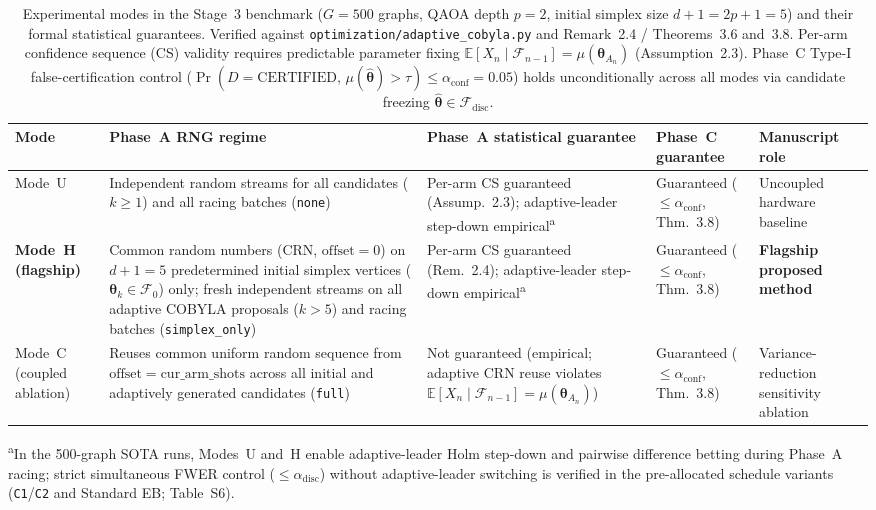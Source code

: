 \begin{table}[htbp]
\caption{Experimental modes in the Stage~3 benchmark ($G=500$ graphs, QAOA depth $p=2$, initial simplex size $d+1=2p+1=5$) and their formal statistical guarantees. Verified against \texttt{optimization/adaptive\_cobyla.py} and Remark~2.4 / Theorems~3.6 and~3.8. Per-arm confidence sequence (CS) validity requires predictable parameter fixing $\mathbb{E}[X_n \mid \mathcal{F}_{n-1}] = \mu(\bm{\theta}_{A_n})$ (Assumption~2.3). Phase~C Type-I false-certification control ($\Pr(D=\mathrm{CERTIFIED},\, \mu(\hat{\bm{\theta}}) > \tau) \le \alpha_{\mathrm{conf}} = 0.05$) holds unconditionally across all modes via candidate freezing $\hat{\bm{\theta}} \in \mathcal{F}_{\mathrm{disc}}$.}
\label{tab:modes}
\centering
\footnotesize
\begin{tabular}{@{}p{2.6cm} p{4.4cm} p{4.1cm} p{3.2cm} p{2.6cm}@{}}
\toprule
Mode & Phase~A RNG regime & Phase~A statistical guarantee & Phase~C guarantee & Manuscript role \\
\midrule
Mode~U & Independent random streams for all candidates ($k \ge 1$) and all racing batches (\texttt{none}) & Per-arm CS guaranteed (Assump.~2.3); adaptive-leader step-down empirical\textsuperscript{a} & Guaranteed ($\le \alpha_{\mathrm{conf}}$, Thm.~3.8) & Uncoupled hardware baseline \\
\textbf{Mode~H (flagship)} & Common random numbers (CRN, $\mathrm{offset}=0$) on $d+1=5$ predetermined initial simplex vertices ($\bm{\theta}_k \in \mathcal{F}_0$) only; fresh independent streams on all adaptive COBYLA proposals ($k > 5$) and racing batches (\texttt{simplex\_only}) & Per-arm CS guaranteed (Rem.~2.4); adaptive-leader step-down empirical\textsuperscript{a} & Guaranteed ($\le \alpha_{\mathrm{conf}}$, Thm.~3.8) & \textbf{Flagship proposed method} \\
Mode~C (coupled ablation) & Reuses common uniform random sequence from $\mathrm{offset}=\mathrm{cur\_arm\_shots}$ across all initial and adaptively generated candidates (\texttt{full}) & Not guaranteed (empirical; adaptive CRN reuse violates $\mathbb{E}[X_n \mid \mathcal{F}_{n-1}] = \mu(\bm{\theta}_{A_n})$) & Guaranteed ($\le \alpha_{\mathrm{conf}}$, Thm.~3.8) & Variance-reduction sensitivity ablation \\
\bottomrule
\end{tabular}
\vspace{0.3em}
\par\noindent\footnotesize\textsuperscript{a}In the 500-graph SOTA runs, Modes~U and~H enable adaptive-leader Holm step-down and pairwise difference betting during Phase~A racing; strict simultaneous FWER control ($\le \alpha_{\mathrm{disc}}$) without adaptive-leader switching is verified in the pre-allocated schedule variants (\texttt{C1}/\texttt{C2} and Standard EB; Table~S6).
\end{table}

